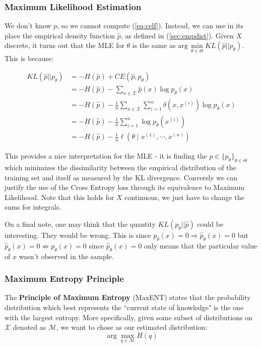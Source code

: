 \documentclass[]{article}
\theoremstyle{mattstyle}
\theoremstyle{definition}
\begin{document}
\subsubsection{Maximum Likelihood Estimation}

We don't know $p$, so we cannot compute (\ref{eq:celf}). Instead, we can use in its place the empirical density function $\hat{p}$, as defined in (\ref{sec:empdist}). Given $X$ discrete, it turns out that the MLE for $\theta$ is the same as $\text{arg}\,\min\limits_{\theta\in\Theta} KL(\hat{p}||p_{\theta})$. This is because:

\begin{align*}
KL(\hat{p}||p_{\theta}) &= -H(\hat{p}) + CE(\hat{p},p_{\theta}) \\
&= -H(\hat{p}) - \sum_{x\in\mathcal{X}}\hat{p}(x)\log p_{\theta}(x)\\
&= -H(\hat{p}) - \frac{1}{n}\sum_{x\in\mathcal{X}}\sum_{i=1}^n\delta(x,x^{(i)}) \log p_{\theta}(x)\\
&= -H(\hat{p}) - \frac{1}{n}\sum_{i=1}^n\log p_{\theta}(x^{(i)})\\
&= -H(\hat{p}) - \frac{1}{n}\ell(\theta \mid x^{(1)}, \cdots, x^{(n)})
\end{align*}

This provides a nice interpretation for the MLE - it is finding the $p\in \{p_{\theta}\}_{\theta\in\Theta}$ which minimizes the dissimilarity between the empirical distribution of the training set and itself as measured by the KL divergence. Conversly we can justify the use of the Cross Entropy loss through its equivalence to Maximum Likelihood. Note that this holds for $X$ continuous, we just have to change the sums for integrals.

On a final note, one may think that the quantity $KL(p_{\theta}|| \hat{p})$ could be interesting. They would be wrong. This is since $p_{\theta}(x)=0 \Rightarrow \hat{p}_{\theta}(x)=0$ but $\hat{p}_{\theta}(x)=0 \not\Rightarrow p_{\theta}(x)=0$ since $\hat{p}_{\theta}(x)=0$ only means that the particular value of $x$ wasn't observed in the sample.	


\subsubsection{Maximum Entropy Principle}

The \textbf{Principle of Maximum Entropy} (MaxENT) states that the probability distribution which best represents the ``current state of knowledge" is the one with the largest entropy. More specifically, given some subset of distributions on $\mathcal{X}$ denoted as $\mathcal{M}$, we want to chose as our estimated distribution:
$$\arg\max\limits_{q \in \mathcal{M}} H(q)$$
\end{document}
